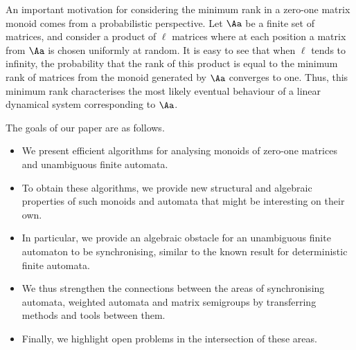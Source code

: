 An important motivation for considering the minimum rank in a zero-one matrix monoid comes from a probabilistic perspective. Let $\Aa$ be a finite set of matrices, and consider a product of $\ell$ matrices where at each position a matrix from $\Aa$ is chosen uniformly at random. It is easy to see that when $\ell$ tends to infinity, the probability that the rank of this product is equal to the minimum rank of matrices from the monoid generated by $\Aa$ converges to one. Thus, this minimum rank characterises the most likely eventual behaviour of a linear dynamical system corresponding to $\Aa$.

The goals of our paper are as follows.
\begin{itemize}
    \item We present efficient algorithms for analysing monoids of zero-one matrices and unambiguous finite automata.

    \item To obtain these algorithms, we provide new structural and algebraic properties of such monoids and automata that might be interesting on their own.

    \item In particular, we provide an algebraic obstacle for an unambiguous finite automaton to be synchronising, similar to the known result for deterministic finite automata. 

    \item We thus strengthen the connections between the areas of synchronising automata, weighted automata and matrix semigroups by transferring methods and tools between them.

    \item Finally, we highlight open problems in the intersection of these areas.
\end{itemize}
